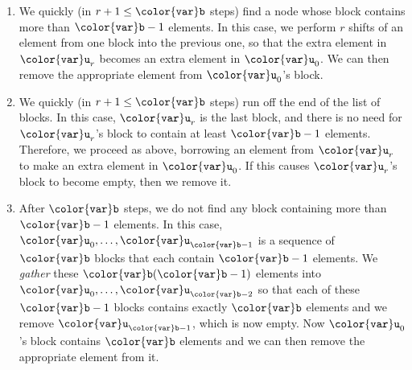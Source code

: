 \documentclass[10pt]{book}
\theoremstyle{plain}
\theoremstyle{definition}
\begin{document}
\begin{enumerate}
\item We quickly (in $r+1\le \ensuremath{\mathtt{{\color{var}b}}}$ steps) find a node whose block contains
more than $\ensuremath{\mathtt{{\color{var}b}}}-1$ elements. In this case, we perform $r$ shifts of an
element from one block into the previous one, so that the extra element
in $\ensuremath{\mathtt{{\color{var}u}}}_r$ becomes an extra element in $\ensuremath{\mathtt{{\color{var}u}}}_0$.  We can then remove the
appropriate element from $\ensuremath{\mathtt{{\color{var}u}}}_0$'s block.

\item We quickly (in $r+1\le \ensuremath{\mathtt{{\color{var}b}}}$ steps) run off the end of the list of
blocks.  In this case, $\ensuremath{\mathtt{{\color{var}u}}}_r$ is the last block, and there is no need
for $\ensuremath{\mathtt{{\color{var}u}}}_r$'s block to contain at least $\ensuremath{\mathtt{{\color{var}b}}}-1$ elements.  Therefore,
we proceed as above, borrowing an element from $\ensuremath{\mathtt{{\color{var}u}}}_r$ to make an extra
element in $\ensuremath{\mathtt{{\color{var}u}}}_0$.  If this causes $\ensuremath{\mathtt{{\color{var}u}}}_r$'s block to become empty,
then we remove it.

\item After \ensuremath{\mathtt{{\color{var}b}}} steps, we do not find any block containing more than
$\ensuremath{\mathtt{{\color{var}b}}}-1$ elements.  In this case, $\ensuremath{\mathtt{{\color{var}u}}}_0,\ldots,\ensuremath{\mathtt{{\color{var}u}}}_{\ensuremath{\mathtt{{\color{var}b}}}-1}$ is a sequence
of \ensuremath{\mathtt{{\color{var}b}}} blocks that each contain $\ensuremath{\mathtt{{\color{var}b}}}-1$ elements.  We \emph{gather}
these $\ensuremath{\mathtt{{\color{var}b}}}(\ensuremath{\mathtt{{\color{var}b}}}-1)$ elements into $\ensuremath{\mathtt{{\color{var}u}}}_0,\ldots,\ensuremath{\mathtt{{\color{var}u}}}_{\ensuremath{\mathtt{{\color{var}b}}}-2}$ so that each
of these $\ensuremath{\mathtt{{\color{var}b}}}-1$ blocks contains exactly \ensuremath{\mathtt{{\color{var}b}}} elements and we remove
$\ensuremath{\mathtt{{\color{var}u}}}_{\ensuremath{\mathtt{{\color{var}b}}}-1}$, which is now empty.  Now $\ensuremath{\mathtt{{\color{var}u}}}_0$'s block contains \ensuremath{\mathtt{{\color{var}b}}}
elements and we can then remove the appropriate element from it.
\end{enumerate}
\end{document}
